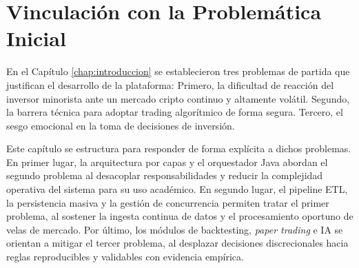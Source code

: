 \section{Vinculación con la Problemática Inicial}

En el Capítulo \ref{chap:introduccion} se establecieron tres problemas de partida que justifican el desarrollo de la plataforma: Primero, la dificultad de reacción del inversor minorista ante un mercado cripto continuo y altamente volátil. Segundo, la barrera técnica para adoptar trading algorítmico de forma segura. Tercero, el sesgo emocional en la toma de decisiones de inversión.

Este capítulo se estructura para responder de forma explícita a dichos problemas. En primer lugar, la arquitectura por capas y el orquestador Java abordan el segundo problema al desacoplar responsabilidades y reducir la complejidad operativa del sistema para su uso académico. En segundo lugar, el pipeline ETL, la persistencia masiva y la gestión de concurrencia permiten tratar el primer problema, al sostener la ingesta continua de datos y el procesamiento oportuno de velas de mercado. Por último, los módulos de backtesting, \textit{paper trading} e IA se orientan a mitigar el tercer problema, al desplazar decisiones discrecionales hacia reglas reproducibles y validables con evidencia empírica.

